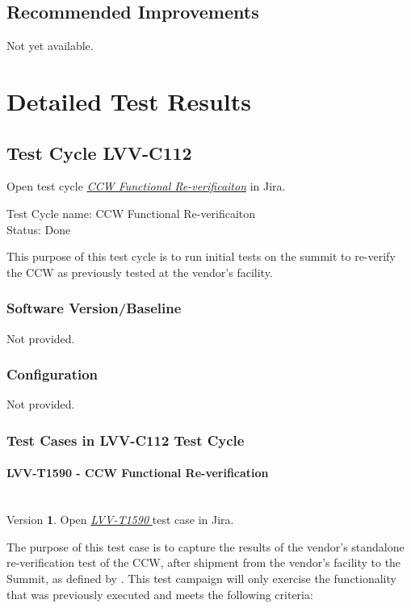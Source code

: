 \documentclass[SE,lsstdraft,STR,toc]{lsstdoc}
\begin{document}
\subsection{Recommended Improvements}
\label{sect:recommendations}

Not yet available.

\newpage
\section{Detailed Test Results}
\label{sect:detailedtestresults}

\subsection{Test Cycle LVV-C112 }

Open test cycle {\it \href{https://jira.lsstcorp.org/secure/Tests.jspa#/testrun/LVV-C112}{CCW Functional Re-verificaiton}} in Jira.

Test Cycle name: CCW Functional Re-verificaiton\\
Status: Done

This purpose of this test cycle is to run initial tests on the summit to
re-verify the CCW as previously tested at the vendor's facility.

\subsubsection{Software Version/Baseline}
Not provided.

\subsubsection{Configuration}
Not provided.

\subsubsection{Test Cases in LVV-C112 Test Cycle}

\paragraph{ LVV-T1590 - CCW Functional Re-verification }\mbox{}\\

Version \textbf{1}.
Open  \href{https://jira.lsstcorp.org/secure/Tests.jspa#/testCase/LVV-T1590}{\textit{ LVV-T1590 } }
test case in Jira.

The purpose of this test case is to capture the results of the vendor's
standalone re-verification test of the CCW, after shipment from the
vendor's facility to the Summit, as defined by . This test
campaign will only exercise the functionality that was previously
executed and meets the following criteria:
\end{document}
